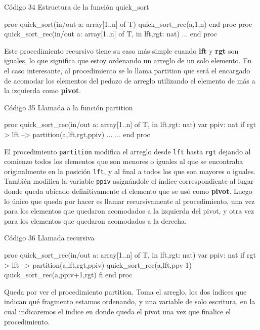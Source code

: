 \begin{codebox}{Código 34}
\footnotesize Estructura de la función quick\_sort
\tcblower
\begin{pascallike}
proc quick_sort(in/out a: array[1..n] of T)
    quick_sort_rec(a,1,n)
end proc
proc quick_sort_rec(in/out a: array[1..n] of T, in lft,rgt: nat)
...
end proc
\end{pascallike}
\end{codebox}
Este procedimiento recursivo tiene su caso más simple cuando \textbf{lft} y \textbf{rgt} son iguales, lo que significa que estoy ordenando un arreglo de un solo elemento. En el caso interesante, al procedimiento se lo llama partition que será el encargado de acomodar los elementos del pedazo de arreglo utilizando el elemento de más a la izquierda como \textbf{pivot}.
\begin{codebox}{Código 35}
\footnotesize Llamada a la función partition
\tcblower
\begin{pascallike}
proc quick_sort_rec(in/out a: array[1..n] of T, in lft,rgt: nat)
    var ppiv: nat
    if rgt > lft --> 
        partition(a,lft,rgt,ppiv)
    ...
...
end proc
\end{pascallike}
\end{codebox}
El procedimiento \texttt{partition} modifica el arreglo desde \texttt{lft} hasta \texttt{rgt} dejando al comienzo todos los elementos que son menores o iguales al que se encontraba originalmente en la posición \texttt{lft}, y al final a todos los que son mayores o iguales. También modifica la variable \texttt{ppiv} asignándole el índice correspondiente al lugar donde queda ubicado definitivamente el elemento que se usó como \textbf{pivot}.
Luego lo único que queda por hacer es llamar recursivamente al procedimiento, una vez para los elementos que quedaron acomodados a la izquierda del pivot, y otra vez para los elementos que quedaron acomodados a la derecha.
\begin{codebox}{Código 36}
\footnotesize Llamada recursiva
\tcblower
\begin{pascallike}
proc quick_sort_rec(in/out a: array[1..n] of T, in lft,rgt: nat)
    var ppiv: nat
    if rgt > lft --> 
        partition(a,lft,rgt,ppiv)
        quick_sort_rec(a,lft,ppv-1)
        quick_sort_rec(a,ppiv+1,rgt)
    fi
end proc
\end{pascallike}
\end{codebox}
Queda por ver el procedimiento partition. Toma el arreglo, los dos índices que indican qué fragmento estamos ordenando, y una variable de solo escritura, en la cual indicaremos el índice en donde queda el pivot una vez que finalice el procedimiento.

